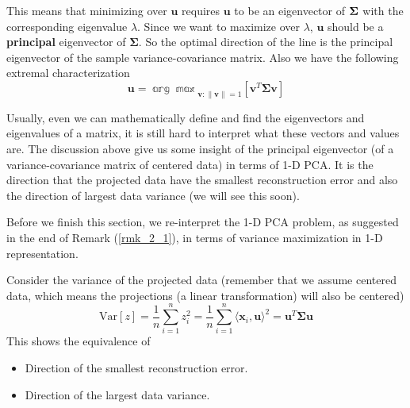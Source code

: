 \documentclass[../book-template.tex]{subfiles}
\begin{document}
This means that minimizing over $\bm{u}$ requires $\bm{u}$ to be an eigenvector of ${\bf \Sigma}$ with the corresponding eigenvalue $\lambda$. Since we want to maximize over $\lambda$, $\bm{u}$ should be a \textbf{principal} eigenvector of $\bm{\Sigma}$. So the optimal direction of the line is the principal eigenvector of the sample variance-covariance matrix. Also we have the following extremal characterization
\begin{equation*}
    \bm{u} = \mathbb{\arg\max}_{\bm{v}:\|\bm{v}\|=1}\left[\bm{v}^T\bm{\Sigma v} \right]
\end{equation*}
\begin{remark}\label{rmk_2_1}
Usually, even we can mathematically define and find the eigenvectors and eigenvalues of a matrix, it is still hard to interpret what these vectors and values are. The discussion above give us some insight of the principal eigenvector (of a variance-covariance matrix of centered data) in terms of 1-D PCA. It is the direction that the projected data have the smallest reconstruction error and also the direction of largest data variance (we will see this soon).
\end{remark}
\par Before we finish this section, we re-interpret the 1-D PCA problem, as suggested in the end of Remark (\ref{rmk_2_1}), in terms of variance maximization in 1-D representation. 
\par Consider the variance of the projected data (remember that we assume centered data, which means the projections (a linear transformation) will also be centered)
\begin{equation*}
    \text{Var}[z]=\frac{1}{n}\sum_{i=1}^{n}z_i^2=\frac{1}{n}\sum_{i=1}^{n}\langle \bm{x}_i,\bm{u}\rangle^2 = \bm{u}^T\bm{\Sigma u}
\end{equation*}
This shows the equivalence of
\begin{itemize}
    \item Direction of the smallest reconstruction error.
    \item Direction of the largest data variance.
\end{itemize}
\end{document}
